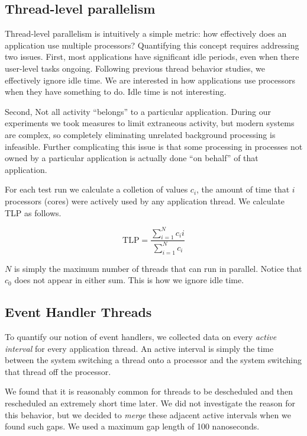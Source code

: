 \documentclass[11pt]{sigplanconf}
\begin{document}
\subsection{Thread-level parallelism}

Thread-level parallelism is intuitively a simple metric: how effectively
does an application use multiple processors?  Quantifying this concept
requires addressing two issues.  First, most applications have
significant idle periods, even when there user-level tasks ongoing.
Following previous thread behavior studies, we effectively ignore idle
time.  We are interested in how applications use processors when they
have something to do.  Idle time is not interesting.

Second, Not all activity ``belongs'' to a particular application.
During our experiments we took measures to limit extraneous activity,
but modern systems are complex, so completely eliminating unrelated
background processing is infeasible.  Further complicating this issue is
that some processing in processes not owned by a particular application
is actually done ``on behalf'' of that application.

For each test run we calculate a colletion of values $c_i$, the amount
of time that $i$ processors (cores) were actively used by any
application thread.  We calculate TLP as follows.

\begin{equation}
\mathrm{TLP} = \frac{\sum_{i=1}^N c_ii}{\sum_{i=1}^N c_i} \nonumber
\end{equation}

$N$ is simply the maximum number of threads that can run in parallel.
Notice that $c_0$ does not appear in either sum.  This is how we ignore
idle time.

\subsection{Event Handler Threads}

To quantify our notion of event handlers, we collected data on every
\emph{active interval} for every application thread.  An active interval
is simply the time between the system switching a thread onto a
processor and the system switching that thread off the processor.

We found that it is reasonably common for threads to be descheduled and
then rescheduled an extremely short time later.  We did not investigate
the reason for this behavior, but we decided to \emph{merge} these
adjacent active intervals when we found such gaps.  We used a maximum
gap length of 100 nanoseconds.
\end{document}
